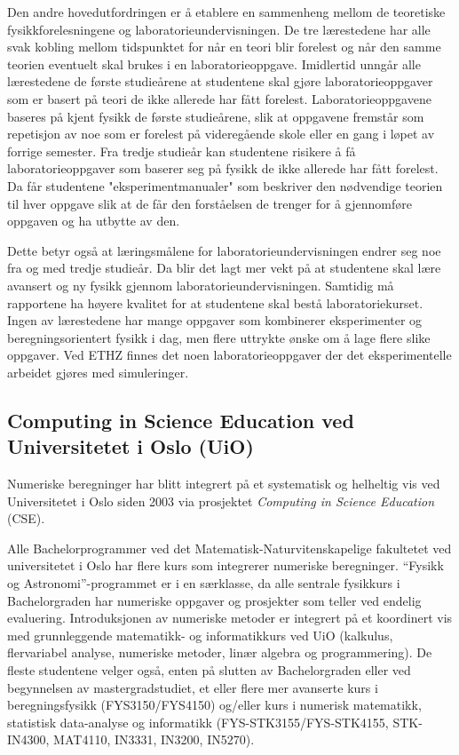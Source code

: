 \documentclass{article}
\begin{document}
Den andre hovedutfordringen er å etablere en sammenheng mellom de teoretiske fysikkforelesningene og laboratorieundervisningen. De tre lærestedene har alle svak kobling mellom tidspunktet for når en teori blir forelest og når den samme teorien eventuelt skal brukes i en laboratorieoppgave. Imidlertid unngår alle lærestedene de første studieårene at studentene skal gjøre laboratorieoppgaver som er basert på teori de ikke allerede har fått forelest. Laboratorieoppgavene baseres på kjent fysikk de første studieårene, slik at oppgavene fremstår som repetisjon av noe som er forelest på videregående skole eller en gang i løpet av forrige semester. Fra tredje studieår kan studentene risikere å få laboratorieoppgaver som baserer seg på fysikk de ikke allerede har fått forelest. Da får studentene "eksperimentmanualer" som beskriver den nødvendige teorien til hver oppgave slik at de får den forståelsen de trenger for å gjennomføre oppgaven og ha utbytte av den.

Dette betyr også at læringsmålene for laboratorieundervisningen endrer seg noe fra og med tredje studieår. Da blir det lagt mer vekt på at studentene skal lære avansert og ny fysikk gjennom laboratorieundervisningen. Samtidig må rapportene ha høyere kvalitet for at studentene skal bestå laboratoriekurset. Ingen av lærestedene har mange oppgaver som kombinerer eksperimenter og beregningsorientert fysikk i dag, men flere uttrykte ønske om å lage flere slike oppgaver. Ved ETHZ finnes det noen laboratorieoppgaver der det eksperimentelle arbeidet gjøres med simuleringer.

\subsection{Computing in Science Education ved Universitetet i Oslo (UiO)}
Numeriske beregninger har blitt integrert på et systematisk og helheltig vis ved Universitetet i Oslo siden 2003 via prosjektet \emph{Computing in Science Education} (CSE).

Alle Bachelorprogrammer ved det Matematisk-Naturvitenskapelige fakultetet ved universitetet i Oslo har flere kurs som integrerer numeriske beregninger. ``Fysikk og Astronomi''-programmet er i en særklasse, da alle sentrale fysikkurs i Bachelorgraden har numeriske oppgaver og prosjekter som teller ved endelig evaluering. Introduksjonen av numeriske metoder er integrert på et koordinert vis med grunnleggende matematikk- og informatikkurs ved UiO (kalkulus, flervariabel analyse, numeriske metoder, linær algebra og programmering). De fleste studentene velger også, enten på slutten av Bachelorgraden eller ved begynnelsen av mastergradstudiet, et eller flere mer avanserte kurs i beregningsfysikk (FYS3150/FYS4150) og/eller kurs i numerisk matematikk, statistisk data-analyse og informatikk (FYS-STK3155/FYS-STK4155, STK-IN4300, MAT4110, IN3331, IN3200, IN5270).
\end{document}
